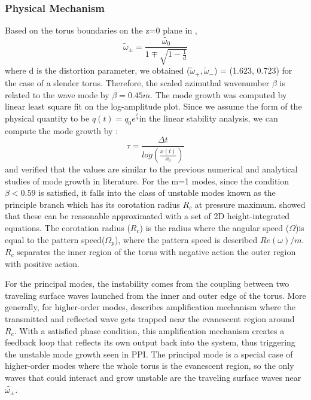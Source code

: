 \documentclass[iop,revtex4]{emulateapj}
\begin{document}
\subsubsection{Physical Mechanism}
\par Based on the torus boundaries on the z=0 plane in \citep{Papaloizou:1984A},
\begin{equation}
\tilde{\omega}_\pm  = \frac{\tilde{\omega_0}}{1\mp\sqrt{1-\frac{1}{d}}}
\label{boundary}
\end{equation}
where d is the distortion parameter, we obtained ($\tilde{\omega}_+,\tilde{\omega}_-$) = (1.623, 0.723) for the case of a slender torus. Therefore, the scaled azimuthal wavenumber $\beta$ is related to the wave mode by $\beta = 0.45 m $. The mode growth was computed by linear least square fit on the log-amplitude plot. Since we assume the form of the physical quantity to be $q(t)=q_0 e^{\frac{t}{\tau}}$in the linear stability analysis, we can compute the mode growth by : 
\begin{equation}
\tau = \frac{\Delta t}{log(\frac{x(t)}{x_0})}
\end{equation}
and verified that the values are similar to the previous numerical and analytical studies of mode growth in literature. For the m=1 modes, since the condition $\beta<0.59$ is satisfied, it falls into the class of unstable modes known as the principle branch which has its corotation radius $R_c$ at pressure maximum. \cite{Goldreich:1986A} showed that these can be reasonable approximated with a set of 2D height-integrated equations. The corotation radius ($R_c$) is the radius where the angular speed ($\Omega$)is equal to the pattern speed($\Omega_p$), where the pattern speed is described $Re(\omega)/m$. $R_c$ separates the inner region of the torus with negative action the outer region with positive action.
\par For the principal modes, the instability comes from the coupling between two traveling surface waves launched from the inner and outer edge of the torus. More generally, for higher-order modes, \cite{Narayan:1987A} describes amplification mechanism where the transmitted and reflected wave gets trapped near the evanescent region around $R_c$. With a satisfied phase condition, this amplification mechanism creates a feedback loop that reflects its own output back into the system, thus triggering the unstable mode growth seen in \ac{PPI}. The principal mode is a special case of higher-order modes where the whole torus is the evanescent region, so the only waves that could interact and grow unstable are the traveling surface waves near $\tilde{\omega_\pm}$.
\end{document}

